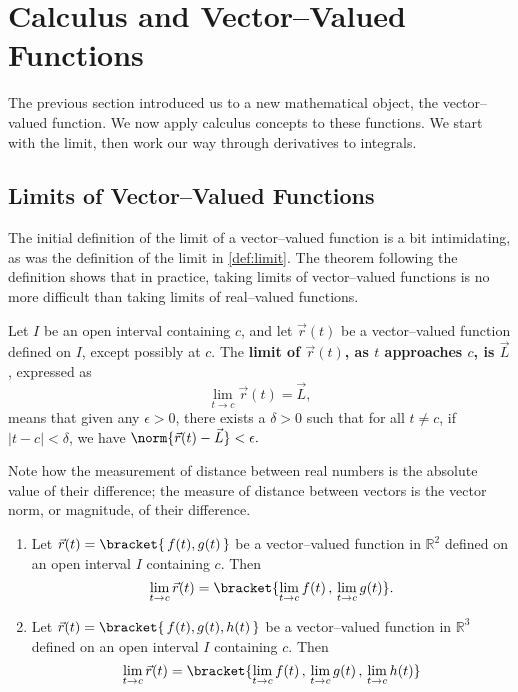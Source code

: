 \section{Calculus and Vector--Valued Functions}\label{sec:vvf_calc}

The previous section introduced us to a new mathematical object, the vector--valued function. We now apply calculus concepts to these functions. We start with the limit, then work our way through derivatives to integrals.

\subsection*{Limits of Vector--Valued Functions}

The initial definition of the limit of a vector--valued function is a bit intimidating, as was the definition of the limit in \autoref{def:limit}. The theorem following the definition shows that in practice, taking limits of vector--valued functions is no more difficult than taking limits of real--valued functions.

{Let $I$ be an open interval containing $c$, and let $\vec r(t)$ be a vector--valued function defined on $I$, except possibly at $c$. %
The \textbf{limit of $\vec r(t)$, as $t$ approaches $c$, is $\vec L$}, expressed as 
$$\lim_{t\to c} \vec r(t) = \vec L,$$ means that given any $\epsilon>0$, there exists a $\delta>0$ such that for all $t\neq c$, if $|t-c| <\delta$, we have $\norm{\vec r(t) - \vec L} < \epsilon.$
}

Note how the measurement of distance between real numbers is the absolute value of their difference; the measure of distance between vectors is the vector norm, or magnitude, of their difference.

{\begin{enumerate}
	\item Let $\vec r(t) =\bracket{\,f(t),g(t)\,}$ be a vector--valued function in $\mathbb{R}^2$ defined on an open interval $I$ containing $c$. Then
	$$\lim_{t\to c} \vec r(t) =\bracket{\lim_{t\to c}f(t)\, , \,\lim_{t\to c} g(t)}.$$
	\item Let $\vec r(t) =\bracket{\,f(t),g(t),h(t)\,}$ be a vector--valued function in $\mathbb{R}^3$ defined on an open interval $I$ containing $c$. Then 
	$$\lim_{t\to c} \vec r(t) =\bracket{\lim_{t\to c}f(t)\, , \,\lim_{t\to c} g(t)\,, \,\lim_{t\to c} h(t)}$$
\end{enumerate}}

